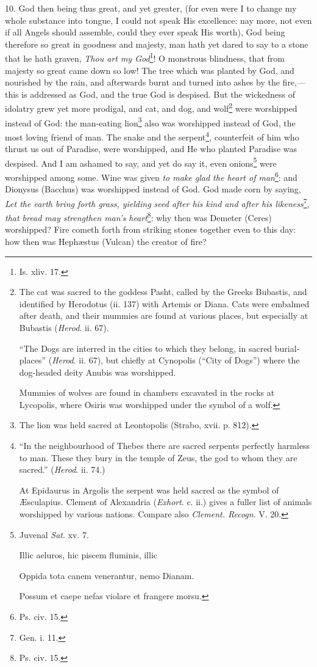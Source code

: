 10. God then being thus great, and yet greater, (for even were I to change my whole substance into tongue, I could not speak His excellence: nay more, not even if all Angels should assemble, could they ever speak His worth), God being therefore so great in goodness and majesty, man hath yet dared to say to a stone that he hath graven, \emph{Thou art my God}\footnote{Is. xliv. 17.}! O monstrous blindness, that from majesty so great came down so low! The tree which was planted by God, and nourished by the rain, and afterwards burnt and turned into ashes by the fire,—this is addressed as God, and the true God is despised. But the wickedness of idolatry grew yet more prodigal, and cat, and dog, and wolf\footnote{The cat was sacred to the goddess Pasht, called by the Greeks Bubastis, and identified by Herodotus (ii. 137) with Artemis or Diana. Cats were embalmed after death, and their mummies are found at various places, but especially at Bubastis (\emph{Herod}. ii. 67). \par “The Dogs are interred in the cities to which they belong, in sacred burial-places” (\emph{Herod}. ii. 67), but chiefly at Cynopolis (“City of Dogs”) where the dog-headed deity Anubis was worshipped. \par Mummies of wolves are found in chambers excavated in the rocks at Lycopolis, where Osiris was worshipped under the symbol of a wolf.} were worshipped instead of God: the man-eating lion\footnote{The lion was held sacred at Leontopolis (Strabo, xvii. p. 812).} also was worshipped instead of God, the most loving friend of man. The snake and the serpent\footnote{“In the neighbourhood of Thebes there are sacred serpents perfectly harmless to man. These they bury in the temple of Zeus, the god to whom they are sacred.” (\emph{Herod}. ii. 74.) \par At Epidaurus in Argolis the serpent was held sacred as the symbol of Æsculapius. Clement of Alexandria (\emph{Exhort}. c. ii.) gives a fuller list of animals worshipped by various nations. Compare also \emph{Clement. Recogn}. V. 20.}, counterfeit of him who thrust us out of Paradise, were worshipped, and He who planted Paradise was despised. And I am ashamed to say, and yet do say it, even onions\footnote{Juvenal \emph{Sat}. xv. 7. \par Illic aeluros, hic piscem fluminis, illic \par Oppida tota canem venerantur, nemo Dianam. \par Possum et caepe nefas violare et frangere morsu.} were worshipped among some. Wine was given \emph{to make glad the heart of man}\footnote{Ps. civ. 15.}: and Dionysus (Bacchus) was worshipped instead of God. God made corn by saying, \emph{Let the earth bring forth grass, yielding seed after his kind and after his likeness}\footnote{Gen. i. 11.}, \emph{that bread may strengthen man’s heart}\footnote{Ps. civ. 15.}: why then was Demeter (Ceres) worshipped? Fire cometh forth from striking stones together even to this day: how then was Hephæstus (Vulcan) the creator of fire?

